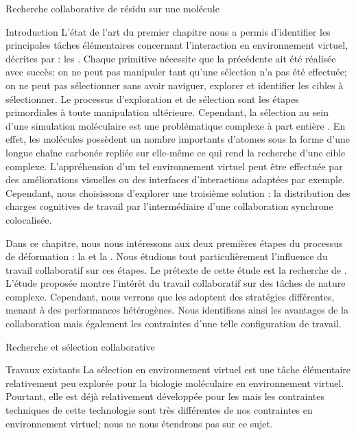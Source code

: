 \documentclass[myfrancais,ngerman,english,frenchb]{mythesis}
\begin{document}
	\begin{mychapter}{Recherche collaborative de résidu sur une molécule}
		\begin{mysection}{Introduction}
			L'état de l'art du premier chapitre nous a permis d'identifier les principales tâches élémentaires concernant l'interaction en environnement virtuel, décrites par  : les  .
			Chaque primitive nécessite que la précédente ait été réalisée avec succès; on ne peut pas manipuler tant qu'une sélection n'a pas été effectuée; on ne peut pas sélectionner sans avoir naviguer, explorer et identifier les cibles à sélectionner.
			Le processus d'exploration et de sélection sont les étapes primordiales à toute manipulation ultérieure.
			Cependant, la sélection au sein d'une simulation moléculaire est une problématique complexe à part entière .
			En effet, les molécules possèdent un nombre importants d'atomes sous la forme d'une longue chaîne carbonée repliée sur elle-même ce qui rend la recherche d'une cible complexe.
			L'appréhension d'un tel environnement virtuel peut être effectuée par des améliorations visuelles  ou des interfaces d'interactions adaptées  par exemple.
			Cependant, nous choisissons d'explorer une troisième solution : la distribution des charges cognitives de travail par l'intermédiaire d'une collaboration synchrone colocalisée.

			Dans ce chapitre, nous nous intéressons aux deux premières étapes du processus de déformation : la  et la  .
			Nous étudions tout particulièrement l'influence du travail collaboratif sur ces étapes.
			Le prétexte de cette étude est la recherche de .
			L'étude proposée montre l'intérêt du travail collaboratif sur des tâches de nature complexe.
			Cependant, nous verrons que les  adoptent des stratégies différentes, menant à des performances hétérogènes.
			Nous identifions ainsi les avantages de la collaboration mais également les contraintes d'une telle configuration de travail.
		\end{mysection}
		\begin{mysection}{Recherche et sélection collaborative}
			\begin{mysubsection}{Travaux existants}
				La sélection en environnement virtuel est une tâche élémentaire relativement peu explorée pour la biologie moléculaire en environnement virtuel.
				Pourtant, elle est déjà relativement développée pour les  mais les contraintes techniques de cette technologie sont très différentes de nos contraintes en environnement virtuel; nous ne nous étendrons pas sur ce sujet.


\end{mysubsection}
\end{mysection}
\end{mychapter}
\end{document}
